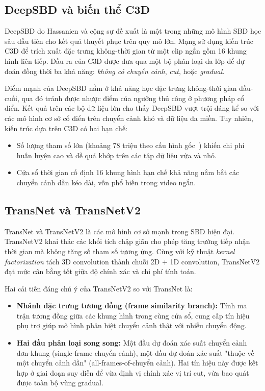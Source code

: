 \subsection{DeepSBD và biến thể C3D}
DeepSBD do Hassanien và cộng sự đề xuất \cite{hassanien2017largescale} là một trong những mô hình SBD học sâu đầu tiên cho kết quả thuyết phục trên quy mô lớn. Mạng sử dụng kiến trúc C3D \cite{tran2015c3d} để trích xuất đặc trưng không-thời gian từ một clip ngắn gồm 16 khung hình liên tiếp. Đầu ra của C3D được đưa qua một bộ phân loại đa lớp để dự đoán đồng thời ba khả năng: \textit{không có chuyển cảnh}, \textit{cut}, hoặc \textit{gradual}.

Điểm mạnh của DeepSBD nằm ở khả năng học đặc trưng không-thời gian đầu-cuối, qua đó tránh được nhược điểm của ngưỡng thủ công ở phương pháp cổ điển. Kết quả trên các bộ dữ liệu lớn cho thấy DeepSBD vượt trội đáng kể so với các mô hình cơ sở cổ điển trên chuyển cảnh khó và dữ liệu đa miền. Tuy nhiên, kiến trúc dựa trên C3D có hai hạn chế:
\begin{itemize}
    \item Số lượng tham số lớn (khoảng 78 triệu theo cấu hình gốc~\cite{tran2015c3d}) khiến chi phí huấn luyện cao và dễ quá khớp trên các tập dữ liệu vừa và nhỏ.
    \item Cửa sổ thời gian cố định 16 khung hình hạn chế khả năng nắm bắt các chuyển cảnh dần kéo dài, vốn phổ biến trong video ngắn.
\end{itemize}

\subsection{TransNet và TransNetV2}
TransNet \cite{soucek2019transnet} và TransNetV2 \cite{soucek2020transnetv2} là các mô hình cơ sở mạnh trong SBD hiện đại. TransNetV2 khai thác các khối tích chập giãn cho phép tăng trường tiếp nhận thời gian mà không tăng số tham số tương ứng. Cùng với kỹ thuật \textit{kernel factorization} tách 3D convolution thành chuỗi 2D + 1D convolution, TransNetV2 đạt mức cân bằng tốt giữa độ chính xác và chi phí tính toán.

Hai cải tiến đáng chú ý của TransNetV2 so với TransNet là:
\begin{itemize}
    \item \textbf{Nhánh đặc trưng tương đồng (frame similarity branch):} Tính ma trận tương đồng giữa các khung hình trong cùng cửa sổ, cung cấp tín hiệu phụ trợ giúp mô hình phân biệt chuyển cảnh thật với nhiễu chuyển động.
    \item \textbf{Hai đầu phân loại song song:} Một đầu dự đoán xác suất chuyển cảnh đơn-khung (single-frame chuyển cảnh), một đầu dự đoán xác suất "thuộc về một chuyển cảnh dần" (all-frames-of-chuyển cảnh). Hai tín hiệu này được kết hợp ở giai đoạn suy diễn để vừa định vị chính xác vị trí cut, vừa bao quát được toàn bộ vùng gradual.
\end{itemize}

